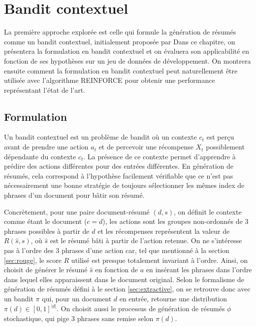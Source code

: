 \chapter{Bandit contextuel}
\label{chap:bandit_contextuel}

La première approche explorée est celle qui formule la génération de
résumés comme un bandit contextuel, initialement proposée par \citep{dong2018banditsum}
Dans ce chapitre, on présentera la formulation en bandit contextuel et
on évaluera son applicabilité en fonction de ses hypothèses sur un jeu de données
de développement.
On montrera ensuite comment la formulation en bandit contextuel peut
naturellement être utilisée avec l'algorithme REINFORCE \cite{williams1992simple}
pour obtenir une performance représentant l'état de l'art.

\section{Formulation}

Un bandit contextuel est un problème de bandit où un contexte $c_t$ est perçu
avant de prendre une action $a_t$ et de percevoir une récompense $X_t$
possiblement dépendante du contexte $c_t$.
La présence de ce contexte permet d'apprendre à prédire des actions différentes
pour des entrées différentes.
En génération de résumés, cela correspond à l'hypothèse facilement vérifiable
que ce n'est pas nécessairement une bonne stratégie de toujours sélectionner
les mêmes index de phrases d'un document pour bâtir son résumé.

Concrètement, pour une paire document-résumé $(d, s)$, on définit le contexte
comme étant le document ($c=d$), les actions sont les groupes non-ordonnés de 3 phrases
possibles à partir de $d$ et les récompenses représentent la valeur de $R(\hat{s}, s)$,
où $\hat{s}$ est le résumé bâti à partir de l'action retenue.
On ne s'intéresse pas à l'ordre des 3 phrases d'une action car, tel que mentionné
à la section \ref{sec:rouge}, le score $R$ utilisé est presque totalement invariant à l'ordre.
Ainsi, on choisit de générer le résumé $\hat{s}$ en fonction de $a$ en insérant les phrases
dans l'ordre dans lequel elles apparaissent dans le document original.
Selon le formalisme de génération de résumés défini à le section \ref{sec:extractive},
on se retrouve donc avec un bandit $\pi$ qui, pour un document $d$ en entrée, retourne
une distribution $\pi(d) \in [0,1]^{|d|}$.
On choisit aussi le processus de génération de résumés $\phi$ stochastique,
qui pige 3 phrases sans remise selon $\pi(d)$.

